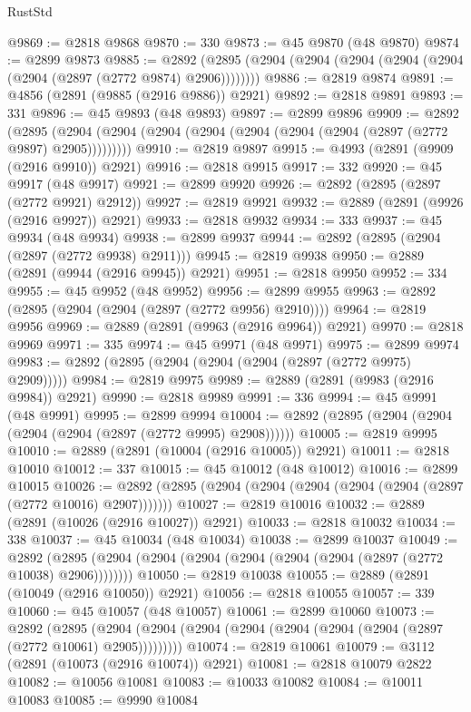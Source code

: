 \begin{lexlean}{RustStd}
\begin{coremodule}
@9869 := @2818 @9868
@9870 := 330
@9873 := @45 @9870 (@48 @9870)
@9874 := @2899 @9873
@9885 := @2892 (@2895 (@2904 (@2904 (@2904 (@2904 (@2904 (@2904 (@2897 (@2772 @9874) @2906))))))))
@9886 := @2819 @9874
@9891 := @4856 (@2891 (@9885 (@2916 @9886)) @2921)
@9892 := @2818 @9891
@9893 := 331
@9896 := @45 @9893 (@48 @9893)
@9897 := @2899 @9896
@9909 := @2892
    (@2895 (@2904 (@2904 (@2904 (@2904 (@2904 (@2904 (@2904 (@2897 (@2772 @9897) @2905)))))))))
@9910 := @2819 @9897
@9915 := @4993 (@2891 (@9909 (@2916 @9910)) @2921)
@9916 := @2818 @9915
@9917 := 332
@9920 := @45 @9917 (@48 @9917)
@9921 := @2899 @9920
@9926 := @2892 (@2895 (@2897 (@2772 @9921) @2912))
@9927 := @2819 @9921
@9932 := @2889 (@2891 (@9926 (@2916 @9927)) @2921)
@9933 := @2818 @9932
@9934 := 333
@9937 := @45 @9934 (@48 @9934)
@9938 := @2899 @9937
@9944 := @2892 (@2895 (@2904 (@2897 (@2772 @9938) @2911)))
@9945 := @2819 @9938
@9950 := @2889 (@2891 (@9944 (@2916 @9945)) @2921)
@9951 := @2818 @9950
@9952 := 334
@9955 := @45 @9952 (@48 @9952)
@9956 := @2899 @9955
@9963 := @2892 (@2895 (@2904 (@2904 (@2897 (@2772 @9956) @2910))))
@9964 := @2819 @9956
@9969 := @2889 (@2891 (@9963 (@2916 @9964)) @2921)
@9970 := @2818 @9969
@9971 := 335
@9974 := @45 @9971 (@48 @9971)
@9975 := @2899 @9974
@9983 := @2892 (@2895 (@2904 (@2904 (@2904 (@2897 (@2772 @9975) @2909)))))
@9984 := @2819 @9975
@9989 := @2889 (@2891 (@9983 (@2916 @9984)) @2921)
@9990 := @2818 @9989
@9991 := 336
@9994 := @45 @9991 (@48 @9991)
@9995 := @2899 @9994
@10004 := @2892 (@2895 (@2904 (@2904 (@2904 (@2904 (@2897 (@2772 @9995) @2908))))))
@10005 := @2819 @9995
@10010 := @2889 (@2891 (@10004 (@2916 @10005)) @2921)
@10011 := @2818 @10010
@10012 := 337
@10015 := @45 @10012 (@48 @10012)
@10016 := @2899 @10015
@10026 := @2892 (@2895 (@2904 (@2904 (@2904 (@2904 (@2904 (@2897 (@2772 @10016) @2907)))))))
@10027 := @2819 @10016
@10032 := @2889 (@2891 (@10026 (@2916 @10027)) @2921)
@10033 := @2818 @10032
@10034 := 338
@10037 := @45 @10034 (@48 @10034)
@10038 := @2899 @10037
@10049 := @2892 (@2895 (@2904 (@2904 (@2904 (@2904 (@2904 (@2904 (@2897 (@2772 @10038) @2906))))))))
@10050 := @2819 @10038
@10055 := @2889 (@2891 (@10049 (@2916 @10050)) @2921)
@10056 := @2818 @10055
@10057 := 339
@10060 := @45 @10057 (@48 @10057)
@10061 := @2899 @10060
@10073 := @2892
    (@2895 (@2904 (@2904 (@2904 (@2904 (@2904 (@2904 (@2904 (@2897 (@2772 @10061) @2905)))))))))
@10074 := @2819 @10061
@10079 := @3112 (@2891 (@10073 (@2916 @10074)) @2921)
@10081 := @2818 @10079 @2822
@10082 := @10056 @10081
@10083 := @10033 @10082
@10084 := @10011 @10083
@10085 := @9990 @10084

\end{coremodule}
\end{lexlean}
